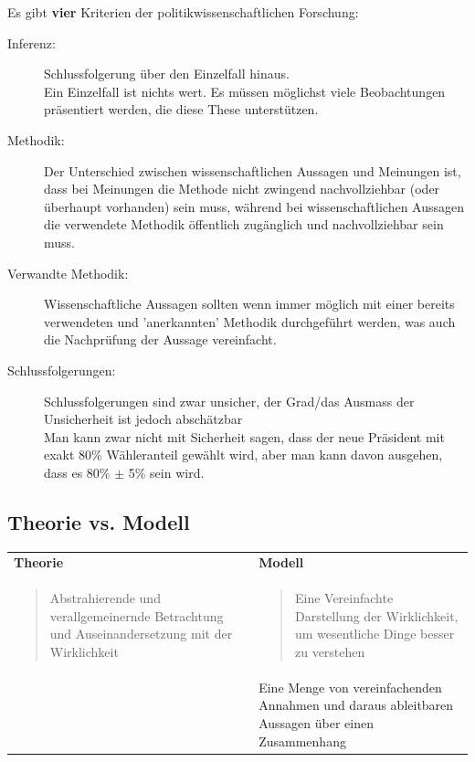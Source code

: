 \documentclass[a4paper, 11pt]{article}
\begin{document}
\vspace{10px }

\noindent Es gibt \textbf{vier} Kriterien der politikwissenschaftlichen Forschung: 

\begin{description}
	\item[Inferenz: ] Schlussfolgerung über den Einzelfall hinaus. \\
	Ein Einzelfall ist nichts wert. Es müssen möglichst viele Beobachtungen präsentiert werden, die diese These unterstützen.
	\item[Methodik: ] Der Unterschied zwischen wissenschaftlichen Aussagen und Meinungen ist, dass bei Meinungen die Methode nicht zwingend nachvollziehbar (oder überhaupt vorhanden) sein muss, während bei wissenschaftlichen Aussagen die verwendete Methodik öffentlich zugänglich und nachvollziehbar sein muss.
	\item[Verwandte Methodik: ] Wissenschaftliche Aussagen sollten wenn immer möglich mit einer bereits verwendeten und 'anerkannten' Methodik durchgeführt werden, was auch die Nachprüfung der Aussage vereinfacht.
	\item[Schlussfolgerungen: ] Schlussfolgerungen sind zwar unsicher, der Grad/das Ausmass der Unsicherheit ist jedoch abschätzbar \\
	Man kann zwar nicht mit Sicherheit sagen, dass der neue Präsident mit exakt 80\% Wähleranteil gewählt wird, aber man kann davon ausgehen, dass es 80\% $\pm$ 5\% sein wird.
\end{description}

\subsection{Theorie vs. Modell}

\begin{tabularx}{\textwidth}{XX} 
	\textbf{Theorie} &  \textbf{Modell}\\ 
		\blockquote{Abstrahierende und verallgemeinernde Betrachtung und Auseinandersetzung mit der Wirklichkeit} & \blockquote{Eine Vereinfachte Darstellung der Wirklichkeit, um wesentliche Dinge besser zu verstehen} \\
		  & Eine Menge von vereinfachenden Annahmen und daraus ableitbaren Aussagen über einen Zusammenhang \\ 
\end{tabularx}

\vspace{10px}
\end{document}
